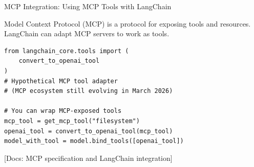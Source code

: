 \documentclass[aspectratio=169,11pt]{beamer}
\newcommand{\docref}[1]{{\scriptsize\color{docgray}[Docs: #1]}}
\begin{document}
\begin{frame}[fragile,shrink=2]{MCP Integration: Using MCP Tools with LangChain}
\begin{conceptbox}
Model Context Protocol (MCP) is a protocol for exposing tools and resources. LangChain can adapt MCP servers to work as tools.
\end{conceptbox}

\begin{codebox}
\begin{lstlisting}
from langchain_core.tools import (
    convert_to_openai_tool
)
# Hypothetical MCP tool adapter
# (MCP ecosystem still evolving in March 2026)

# You can wrap MCP-exposed tools
mcp_tool = get_mcp_tool("filesystem")
openai_tool = convert_to_openai_tool(mcp_tool)
model_with_tool = model.bind_tools([openai_tool])
\end{lstlisting}
\end{codebox}

\textcolor{docgray}{\docref{MCP specification and LangChain integration}}
\end{frame}
\end{document}
